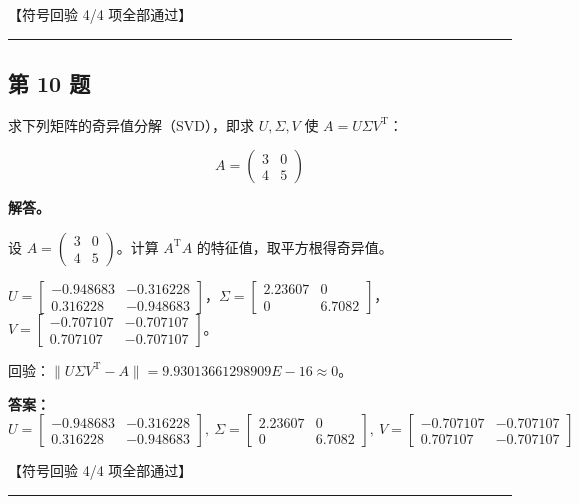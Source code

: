 \documentclass[12pt, a4paper]{article}
\newcommand{\problem}[1]{\subsection*{第 #1 题}}
\newcommand{\solution}{\textbf{解答。}}
\begin{document}
\textcolor{okgreen}{【符号回验 4/4 项全部通过】}

\vspace{0.8em}
\hrule
\vspace{0.8em}

\problem{10}

求下列矩阵的奇异值分解（SVD），即求 $U, \Sigma, V$ 使 $A = U\Sigma V^{\mathrm{T}}$：

$$
A = \begin{pmatrix} 3 & 0 \\ 4 & 5 \end{pmatrix}
$$

\solution

设 $A = \begin{pmatrix} 3 & 0 \\ 4 & 5 \end{pmatrix}$。计算 $A^{\mathrm{T}}A$ 的特征值，取平方根得奇异值。

$U = \begin{bmatrix} -0.948683 & -0.316228 \\ 0.316228 & -0.948683 \end{bmatrix}$，$\Sigma = \begin{bmatrix} 2.23607 & 0 \\ 0 & 6.7082 \end{bmatrix}$，$V = \begin{bmatrix} -0.707107 & -0.707107 \\ 0.707107 & -0.707107 \end{bmatrix}$。

回验：$\|U\Sigma V^{\mathrm{T}} - A\| = 9.93013661298909E-16 \approx 0$。

\textbf{答案：}
{\small
\[U = \begin{bmatrix} -0.948683 & -0.316228 \\ 0.316228 & -0.948683 \end{bmatrix},\ \Sigma = \begin{bmatrix} 2.23607 & 0 \\ 0 & 6.7082 \end{bmatrix},\ V = \begin{bmatrix} -0.707107 & -0.707107 \\ 0.707107 & -0.707107 \end{bmatrix}\]
}

\textcolor{okgreen}{【符号回验 4/4 项全部通过】}

\vspace{0.8em}
\hrule
\vspace{0.8em}
\end{document}
